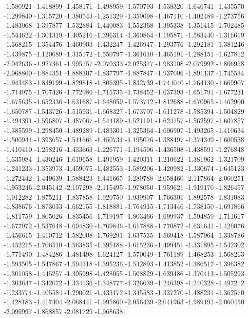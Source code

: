 -1.580921
-1.418899
-1.458171
-1.498959
-1.570793
-1.538320
-1.646741
-1.435570
-1.299840
-1.315720
-1.380543
-1.251329
-1.359098
-1.467110
-1.402489
-1.273756
-1.483068
-1.397877
-1.532884
-1.440083
-1.552368
-1.395338
-1.351415
-1.702485
-1.544622
-1.301319
-1.405216
-1.396314
-1.360864
-1.195871
-1.583440
-1.316619
-1.368215
-1.354476
-1.460903
-1.432247
-1.426947
-1.293776
-1.292181
-1.381246
-1.439875
-1.120689
-1.315172
-1.550797
-1.361610
-1.465191
-1.288151
-1.627812
-2.042636
-1.927361
-1.995757
-2.070333
-2.025377
-1.983108
-2.079992
-1.866958
-2.068860
-1.884351
-1.888307
-1.837797
-1.887847
-1.937006
-1.891137
-1.745534
-1.943483
-1.839199
-1.829818
-1.806395
-1.832739
-1.744040
-1.764130
-1.669907
-1.714975
-1.707426
-1.772986
-1.715735
-1.738452
-1.637393
-1.651791
-1.677231
-1.675635
-1.652336
-1.631687
-1.648059
-1.573712
-1.812688
-1.670965
-1.462900
-1.650787
-1.543726
-1.515931
-1.668327
-1.673707
-1.611278
-1.585394
-1.504829
-1.494391
-1.596807
-1.487067
-1.544189
-1.521191
-1.624157
-1.562597
-1.607857
-1.385599
-1.298450
-1.489289
-1.483301
-1.325364
-1.606907
-1.493265
-1.410634
-1.500944
-1.393657
-1.541661
-1.450734
-1.195076
-1.388497
-1.374349
-1.600538
-1.410410
-1.258216
-1.433663
-1.226771
-1.194506
-1.436508
-1.438591
-1.276848
-1.335984
-1.430246
-1.619658
-1.491959
-1.420311
-1.210622
-1.381962
-1.321709
-1.241233
-1.353973
-1.459075
-1.482553
-1.589206
-1.420982
-1.330674
-1.645123
-1.272442
-1.449639
-1.588423
-1.441665
-1.289788
-2.058460
-2.117864
-2.060251
-1.953246
-2.045142
-2.107298
-2.115495
-1.978050
-1.959621
-1.919170
-1.826457
-1.912282
-1.875211
-1.837858
-1.920750
-1.939907
-1.766301
-1.892578
-1.831083
-1.838676
-1.873033
-1.662155
-1.818881
-1.764915
-1.713446
-1.738150
-1.691866
-1.811759
-1.805026
-1.835456
-1.719197
-1.803466
-1.699937
-1.594859
-1.711617
-1.677972
-1.537648
-1.694830
-1.769846
-1.617888
-1.770872
-1.631641
-1.426076
-1.456615
-1.410712
-1.582008
-1.769291
-1.637535
-1.569418
-1.587964
-1.338786
-1.452215
-1.706510
-1.563835
-1.395188
-1.615236
-1.499451
-1.331895
-1.542302
-1.771490
-1.484286
-1.481498
-1.624127
-1.570049
-1.761189
-1.468253
-1.568263
-1.593505
-1.547867
-1.594318
-1.395236
-1.542893
-1.413852
-1.386517
-1.396382
-1.301058
-1.445257
-1.395998
-1.428055
-1.508829
-1.639486
-1.370413
-1.505293
-1.303647
-1.342072
-1.334136
-1.348777
-1.326639
-1.246398
-1.240328
-1.497212
-1.233774
-1.405584
-1.290021
-1.433172
-1.345583
-1.337270
-1.488231
-1.362570
-1.428183
-1.417404
-2.068441
-1.995860
-2.056439
-2.041963
-1.989191
-2.060450
-2.099997
-1.868857
-2.081729
-1.968638
